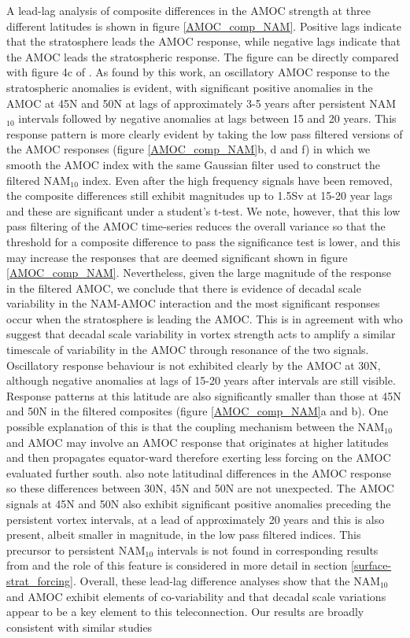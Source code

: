 A lead-lag analysis of composite differences in the AMOC strength at three different latitudes is shown in  figure \ref{AMOC_comp_NAM}. Positive lags indicate that the stratosphere leads the AMOC response, while negative lags indicate that the AMOC leads the stratospheric response. The figure can be directly compared with figure 4c of \cite{reichlerStratospheric2012}. As found by this work, an oscillatory AMOC response to the stratospheric anomalies is evident, with significant positive anomalies in the AMOC at 45N and 50N at lags of approximately 3-5 years after persistent NAM$_{10}$ intervals followed by negative anomalies at lags between 15 and 20 years. This response pattern is more clearly evident by taking the low pass filtered versions of the AMOC responses (figure \ref{AMOC_comp_NAM}b, d and f) in which we smooth the AMOC index with the same Gaussian filter used to construct the filtered NAM$_{10}$ index. Even after the high frequency signals have been removed, the composite differences still exhibit magnitudes up to 1.5Sv at 15-20 year lags and these are significant under a student's t-test. We note, however, that this low pass filtering of the AMOC time-series reduces the overall variance so that the threshold for a composite difference to pass the significance test is lower, and this may increase the responses that are deemed significant shown in figure \ref{AMOC_comp_NAM}. Nevertheless, given the large magnitude of the response in the filtered AMOC, we conclude that there is evidence of decadal scale variability in the NAM-AMOC interaction and the most significant responses occur when the stratosphere is leading the AMOC. This is in agreement with \cite{reichlerStratospheric2012} who suggest that decadal scale variability in vortex strength acts to amplify a similar timescale of variability in the AMOC through resonance of the two signals. Oscillatory response behaviour is not exhibited clearly by the AMOC at 30N, although negative anomalies at lags of 15-20 years after intervals are still visible. Response patterns at this latitude are also significantly smaller than those at 45N and 50N in the filtered composites (figure \ref{AMOC_comp_NAM}a and b). One possible explanation of this is that the coupling mechanism between the NAM$_{10}$ and AMOC may involve an AMOC response that originates at higher latitudes and then propagates equator-ward therefore exerting less forcing on the AMOC evaluated further south. \cite{zhangLatitudinal2010} also note latitudinal differences in the AMOC response so these differences between 30N, 45N and 50N are not unexpected. The AMOC signals at 45N and 50N also exhibit significant positive anomalies preceding the persistent vortex intervals, at a lead of approximately 20 years and this is also present, albeit smaller in magnitude, in the low pass filtered indices. This precursor to persistent NAM$_{10}$ intervals is not found in corresponding results from \cite{reichlerStratospheric2012} and the role of this feature is considered in more detail in section \ref{surface-strat_forcing}. Overall, these lead-lag difference analyses show that the NAM$_{10}$ and AMOC exhibit elements of co-variability and that decadal scale variations appear to be a key element to this teleconnection. Our results are broadly consistent with similar studies 